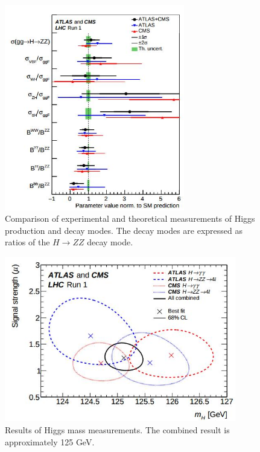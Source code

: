\documentclass[oneside, letterpaper, oldfontcommands]{memoir}
\begin{document}
\begin{figure}[here]
\includegraphics[width=0.7\textwidth]{higgscouplings.jpg}
\caption{Comparison of experimental and theoretical measurements of Higgs production and decay modes. The decay modes are expressed as ratios of the $H \rightarrow ZZ$ decay mode. \cite{Khachatryan:2016vau}}
\label{fig:higgsSMBR}
\end{figure}


\begin{figure}[here]
\includegraphics[width=0.9\textwidth]{higgsmass.jpg}
\caption{Results of Higgs mass measurements. The combined result is approximately 125 GeV. \cite{Aad:2015zhl}}
\label{fig:higgsmass}
\end{figure}
\end{document}

